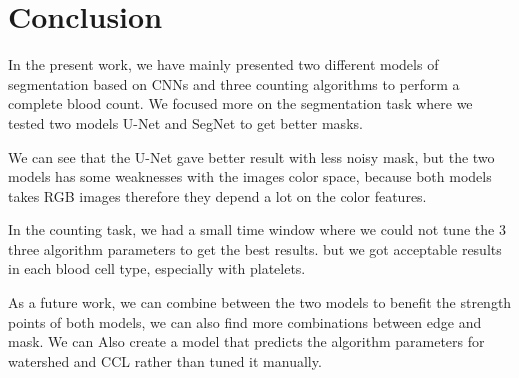 \documentclass[conference]{IEEEtran}
\begin{document}
\section{Conclusion}

In the present work, we have mainly presented two different models of segmentation based on CNNs and three counting algorithms to perform a complete blood count.
We focused more on the segmentation task where  we tested two models U-Net and SegNet to get better masks. 

We can see that the U-Net gave better result with less noisy mask, but the two models has some weaknesses with the images color space, because both models takes RGB images therefore they depend a lot on the color features.

In the counting task, we had a small time window where we could not tune the 3 three algorithm parameters to get the best results. but we got acceptable results in each blood cell type, especially with platelets.

As a future work, we can combine between the two models to benefit the strength points of both models, we can also find more combinations between edge and mask.
We can Also create a model that predicts the algorithm parameters for watershed and CCL rather than tuned it manually. 



\end{document}
